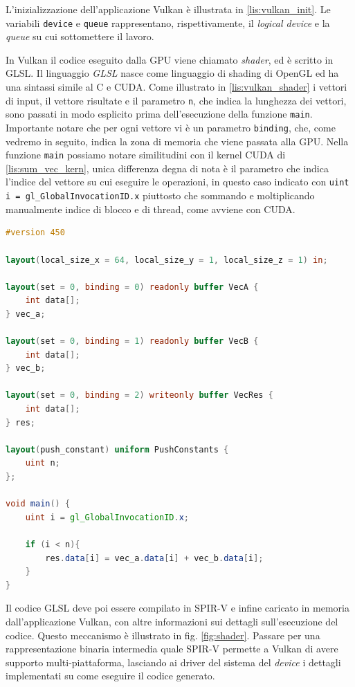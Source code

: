 L'inizializzazione dell'applicazione Vulkan è illustrata in \ref{lis:vulkan_init}. Le variabili \verb|device| e \verb|queue| rappresentano, rispettivamente, il \textit{logical device} e la \textit{queue} su cui sottomettere il lavoro.

In Vulkan il codice eseguito dalla \gls{GPU} viene chiamato \textit{shader}, ed è scritto in \gls{GLSL}. Il linguaggio \textit{GLSL} nasce come linguaggio di shading di OpenGL ed ha una sintassi simile al C e \gls{CUDA}. Come illustrato in \ref{lis:vulkan_shader} i vettori di input, il vettore risultate e il parametro \verb|n|, che indica la lunghezza dei vettori, sono passati in modo esplicito prima dell'esecuzione della funzione \verb|main|. Importante notare che per ogni vettore vi è un parametro \verb|binding|, che, come vedremo in seguito, indica la zona di memoria che viene passata alla \gls{GPU}. Nella funzione \verb|main| possiamo notare similitudini con il kernel \gls{CUDA} di \ref{lis:sum_vec_kern}, unica differenza degna di nota è il parametro che indica l'indice del vettore su cui eseguire le operazioni, in questo caso indicato con \verb|uint i = gl_GlobalInvocationID.x| piuttosto che sommando e moltiplicando manualmente indice di blocco e di thread, come avviene con \gls{CUDA}.

\newpage
\vspace{5mm}
\begin{lstlisting}[language=GLSL, caption=Shader GLSL di somma di vettori, label=lis:vulkan_shader]
#version 450

layout(local_size_x = 64, local_size_y = 1, local_size_z = 1) in;

layout(set = 0, binding = 0) readonly buffer VecA {
    int data[];
} vec_a;

layout(set = 0, binding = 1) readonly buffer VecB {
    int data[];
} vec_b;

layout(set = 0, binding = 2) writeonly buffer VecRes {
    int data[];
} res;

layout(push_constant) uniform PushConstants {
    uint n;
};

void main() {
    uint i = gl_GlobalInvocationID.x;

    if (i < n){
        res.data[i] = vec_a.data[i] + vec_b.data[i];
    }
}
\end{lstlisting}
\vspace{5mm}

Il codice \gls{GLSL} deve poi essere compilato in \gls{SPIR-V} e infine caricato in memoria dall'applicazione Vulkan, con altre informazioni sui dettagli sull'esecuzione del codice. Questo meccanismo è illustrato in fig. \ref{fig:shader}. Passare per una rappresentazione binaria intermedia quale \gls{SPIR-V} permette a Vulkan di avere supporto multi-piattaforma, lasciando ai driver del sistema del \textit{device} i dettagli implementati su come eseguire il codice generato.

